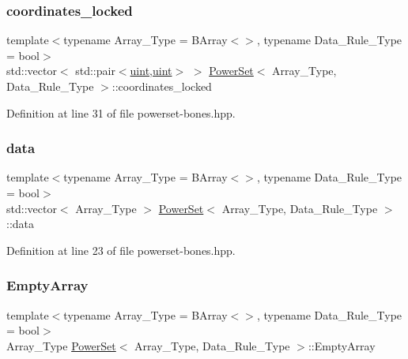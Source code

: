 \mbox{\label{class_power_set_ac5cdec06502e8bd20e36fca3abbb9a3e}} 
\subsubsection{\texorpdfstring{coordinates\+\_\+locked}{coordinates\_locked}}
{\footnotesize\ttfamily template$<$typename Array\+\_\+\+Type  = B\+Array$<$$>$, typename Data\+\_\+\+Rule\+\_\+\+Type  = bool$>$ \\
std\+::vector$<$ std\+::pair$<$\hyperlink{typedefs_8hpp_a91ad9478d81a7aaf2593e8d9c3d06a14}{uint},\hyperlink{typedefs_8hpp_a91ad9478d81a7aaf2593e8d9c3d06a14}{uint}$>$ $>$ \hyperlink{class_power_set}{Power\+Set}$<$ Array\+\_\+\+Type, Data\+\_\+\+Rule\+\_\+\+Type $>$\+::coordinates\+\_\+locked}



Definition at line 31 of file powerset-\/bones.\+hpp.

\mbox{\label{class_power_set_af456c157d157692ba5890c549c51af75}} 
\subsubsection{\texorpdfstring{data}{data}}
{\footnotesize\ttfamily template$<$typename Array\+\_\+\+Type  = B\+Array$<$$>$, typename Data\+\_\+\+Rule\+\_\+\+Type  = bool$>$ \\
std\+::vector$<$ Array\+\_\+\+Type $>$ \hyperlink{class_power_set}{Power\+Set}$<$ Array\+\_\+\+Type, Data\+\_\+\+Rule\+\_\+\+Type $>$\+::data}



Definition at line 23 of file powerset-\/bones.\+hpp.

\mbox{\label{class_power_set_a367db2c97e0301dd0dd78e5e4b458d34}} 
\subsubsection{\texorpdfstring{Empty\+Array}{EmptyArray}}
{\footnotesize\ttfamily template$<$typename Array\+\_\+\+Type  = B\+Array$<$$>$, typename Data\+\_\+\+Rule\+\_\+\+Type  = bool$>$ \\
Array\+\_\+\+Type \hyperlink{class_power_set}{Power\+Set}$<$ Array\+\_\+\+Type, Data\+\_\+\+Rule\+\_\+\+Type $>$\+::Empty\+Array}



